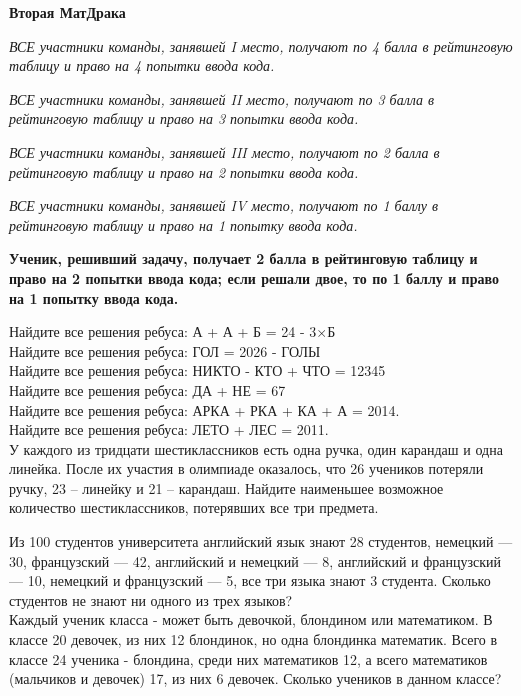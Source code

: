 \centerline{\bf \Huge Вторая МатДрака}

\textit{ВСЕ участники команды, занявшей I место, получают по 4 балла в рейтинговую таблицу и право на 4 попытки ввода кода.}

\textit{ВСЕ участники команды, занявшей II место, получают по 3 балла в рейтинговую таблицу и право на 3 попытки ввода кода.}

\textit{ВСЕ участники команды, занявшей III место, получают по 2 балла в рейтинговую таблицу и право на 2 попытки ввода кода.}

\textit{ВСЕ участники команды, занявшей IV место, получают по 1 баллу в рейтинговую таблицу и право на 1 попытку ввода кода.}

\textbf{Ученик, решивший задачу, получает 2 балла в рейтинговую таблицу и право на 2 попытки ввода кода; если решали двое, то по 1 баллу и право на 1 попытку ввода кода.}

 Найдите все решения ребуса: А + А + Б = 24 - 3$\times$Б \\

 Найдите все решения ребуса: ГОЛ = 2026 - ГОЛЫ\\

 Найдите все решения ребуса: НИКТО - КТО + ЧТО = 12345\\

 Найдите все решения ребуса: ДА + НЕ = 67\\

 Найдите все решения ребуса:  АРКА + РКА + КА + А = 2014.\\

 Найдите все решения ребуса:  ЛЕТО + ЛЕС = 2011.\\


 У каждого из тридцати шестиклассников есть одна ручка, один карандаш и одна линейка. После их участия в олимпиаде оказалось, что 26 учеников потеряли ручку, 23 – линейку и 21 – карандаш. Найдите наименьшее возможное количество шестиклассников, потерявших все три предмета.

 Из 100 студентов университета английский язык знают 28 студентов, немецкий — 30, французский — 42, английский и немецкий — 8, английский и французский — 10, немецкий и французский — 5, все три языка знают 3 студента. Сколько студентов не знают ни одного из трех языков?\\

 Каждый ученик класса - может быть девочкой, блондином или математиком. В классе 20 девочек, из них 12
блондинок, но одна блондинка математик. Всего в классе 24 ученика - блондина, среди них математиков 12, а всего
математиков (мальчиков и девочек) 17, из них 6 девочек. Сколько учеников в данном классе?\\

